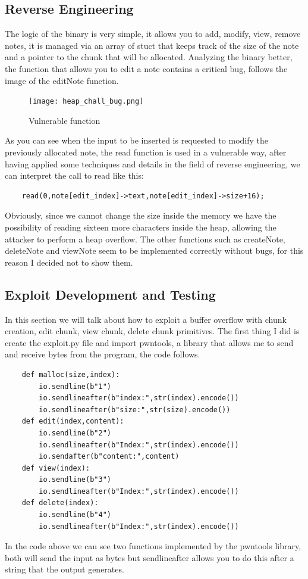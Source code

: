 \documentclass{report}
\begin{document}
    \subsection{Reverse Engineering}
    The logic of the binary is very simple, it allows you to add, modify, view, remove notes, it is managed via an array of stuct that keeps track of the size of the note and a pointer to the chunk that will be allocated.\newline
     Analyzing the binary better, the function that allows you to edit a note contains a critical bug, follows the image of the editNote function.\newline
     \begin{figure}[htbp]
         \centering
         \texttt{[image: heap\_chall\_bug.png]}
         \caption{Vulnerable function}
         \label{fig:enter-label}
     \end{figure}

    As you can see when the input to be inserted is requested to modify the previously allocated note, the read function is used in a vulnerable way, after having applied some techniques and details in the field of reverse engineering, we can interpret the call to read like this:
    \begin{verbatim}
    read(0,note[edit_index]->text,note[edit_index]->size+16);
    \end{verbatim}
    Obviously, since we cannot change the size inside the memory we have the possibility of reading sixteen more characters inside the heap, allowing the attacker to perform a heap overflow.\newline
    The other functions such as createNote, deleteNote and viewNote seem to be implemented correctly without bugs, for this reason I decided not to show them.
    \subsection{Exploit Development and Testing}
    In this section we will talk about how to exploit a buffer overflow with chunk creation, edit chunk, view chunk, delete chunk primitives.\newline
    The first thing I did is create the exploit.py file and import pwntools, a library that allows me to send and receive bytes from the program, the code follows.
    \begin{verbatim}
    def malloc(size,index):
        io.sendline(b"1")
        io.sendlineafter(b"index:",str(index).encode())
        io.sendlineafter(b"size:",str(size).encode())
    def edit(index,content):
        io.sendline(b"2")
        io.sendlineafter(b"Index:",str(index).encode())
        io.sendafter(b"content:",content)
    def view(index):
        io.sendline(b"3")
        io.sendlineafter(b"Index:",str(index).encode())
    def delete(index):
        io.sendline(b"4")
        io.sendlineafter(b"Index:",str(index).encode())
    \end{verbatim}
    In the code above we can see two functions implemented by the pwntools library, both will send the input as bytes but sendlineafter allows you to do this after a string that the output generates.\newline
\end{document}
